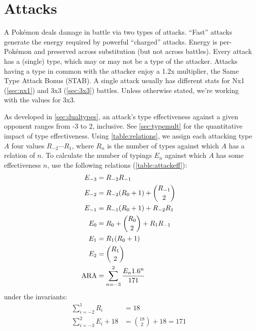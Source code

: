 \chapter{Attacks\label{chap:attacks}}
A Pokémon deals damage in battle via two types of attacks.
``Fast'' attacks generate the energy required by powerful ``charged'' attacks.
Energy is per-Pokémon and preserved across substitution (but not across battles).
Every attack has a (single) type, which may or may not be a type of the attacker.
Attacks having a type in common with the attacker enjoy a 1.2x multiplier, the Same Type Attack Bonus (STAB).
A single attack usually has different stats for Nx1 (\autoref{sec:nx1})
  and 3x3 (\autoref{sec:3x3}) battles.
Unless otherwise stated, we're working with the values for 3x3.

As developed in \autoref{sec:dualtypes}, an attack's type effectiveness
  against a given opponent ranges from -3 to 2, inclusive.
See \autoref{sec:typemult} for the quantitative impact of type effectiveness.
Using \autoref{table:relations}, we assign each attacking type $A$ four values
  $R_{-2}\cdots{}R_1$, where $R_n$ is the number of types against which $A$ has a
  relation of $n$.
To calculate the number of typings $E_n$ against which $A$ has some effectiveness $n$,
  use the following relations (\autoref{table:attackeff}):
\begin{align*}
  E_{-3} &= R_{-2}R_{-1}\\
  E_{-2} &= R_{-2}(R_0 + 1) + \binom{R_{-1}}{2}\\
  E_{-1} &= R_{-1}(R_0 + 1) + R_{-2}R_1\\
   E_{0} &= R_0 + \binom{R_0}{2} + R_{1}R_{-1}\\
   E_{1} &= R_{1}(R_0 + 1)\\
   E_{2} &= \binom{R_1}{2}\\
   \mbox{$\mathrm{ARA}$} &= \sum_{n=-3}^{2} \frac{E_{n}1.6^n}{171}
\end{align*}
under the invariants:
\begin{align*}
    \sum_{i=-2}^{1} R_i &= 18\\
   \sum_{i=-3}^{2} E_i + 18 &= \binom{18}{2} + 18  = 171
\end{align*}
